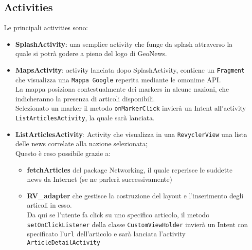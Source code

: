 \documentclass[12pt]{article}
\def\code#1{\texttt{#1}}
\begin{document}
\subsection{Activities}
Le principali activities sono:
\begin{itemize}
\item\textbf{SplashActivity}: una semplice activity che funge da splash attraverso la quale si potrà godere a pieno del logo di GeoNews.

\item\textbf{MapsActivity}: activity lanciata dopo SplashActivity, contiene un \code{Fragment} che visualizza una \code{Mappa Google} reperita mediante le omonime API.\\
La mappa posiziona contestualmente dei markers in alcune nazioni, che indicheranno la presenza di articoli disponibili.\\
Selezionato un marker il metodo \code{onMarkerClick} invierà un Intent all'activity \code{ListArticlesActivity}, la quale sarà lanciata. 

\item\textbf{ListArticlesActivity}: Activity che visualizza in una \code{RevyclerView} una lista delle news correlate alla nazione selezionata;\\
Questo è reso possibile grazie a:
\begin{itemize}
\item\textbf{fetchArticles} del package Networking, il quale reperisce le suddette news da Internet (se ne parlerà successivamente)
\item\textbf{RV\_adapter} che gestisce la costruzione del layout e l'inserimento degli articoli in esso.\\
Da qui se l'utente fa click su uno specifico articolo, il metodo \code{setOnClickListener} della classe \code{CustomViewHolder} invierà un Intent con specificato l'\code{url} dell'articolo e  sarà lanciata l'activity \code{ArticleDetailActivity}
\end{itemize}


\end{itemize}
\end{document}
